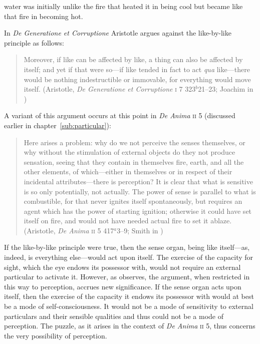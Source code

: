 water was initially unlike the fire that heated it in being cool but became like that fire in becoming hot. 

In \emph{De Generatione et Corruptione} Aristotle argues against the like-by-like principle as follows:
\begin{quote}
	Moreover, if like can be affected by like, a thing can also be affected by itself; and yet if that were so---if like tended in fact to act \emph{qua} like---there would be nothing indestructible or immovable, for everything would move itself. (Aristotle, \emph{De Generatione et Corruptione} \textsc{i} 7 323\( ^{b} \)21--23; Joachim in \citealt[23]{Barnes:1984uq})
\end{quote}
A variant of this argument occurs at this point in \emph{De Anima} \textsc{ii} 5 (discussed earlier in chapter~\ref{sub:particular}):
\begin{quote}
	Here arises a problem: why do we not perceive the senses themselves, or why without the stimulation of external objects do they not produce sensation, seeing that they contain in themselves fire, earth, and all the other elements, of which---either in themselves or in respect of their incidental attributes---there is perception? It is clear that what is sensitive is so only potentially, not actually. The power of sense is parallel to what is combustible, for that never ignites itself spontaneously, but requires an agent which has the power of starting ignition; otherwise it could have set itself on fire, and would not have needed actual fire to set it ablaze. (Aristotle, \emph{De Anima} \textsc{ii} 5 417\( ^{a} \)3--9; Smith in \citealt[29]{Barnes:1984uq})
\end{quote}
If the like-by-like principle were true, then the sense organ, being like itself---as, indeed, is everything else---would act upon itself. The exercise of the capacity for sight, which the eye endows its possessor with, would not require an external particular to activate it. However, as \citet[226--227]{Polansky:2007ly} observes, the argument, when restricted in this way to perception, accrues new significance. If the sense organ acts upon itself, then the exercise of the capacity it endows its possessor with would at best be a mode of self-consciousness. It would not be a mode of sensitivity to external particulars and their sensible qualities and thus could not be a mode of perception. The puzzle, as it arises in the context of \emph{De Anima} \textsc{ii} 5, thus concerns the very possibility of perception.

